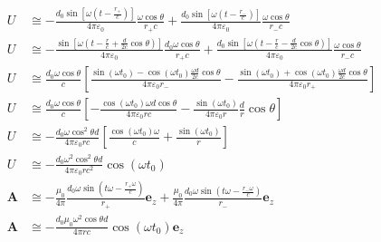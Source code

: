 \begin{align*}
    U&\cong-\frac{d_0\sin\left[\omega\left(t-\frac{r_{+}}{c}\right)\right]}{4\pi\varepsilon_0}\frac{
    \omega \cos\theta}{r_+c}
    +\frac{d_0\sin\left[\omega\left(t-\frac{r_-}{c}\right)\right]}{4\pi\varepsilon_0}\frac{\omega \cos\theta}{r_-c}\\
    U&\cong-\frac{\sin\left[\omega\left(t-\frac{r}{c}+\frac{d}{2c}\cos\theta\right)\right]}{4\pi\varepsilon_0}\frac{
    d_0\omega \cos\theta}{r_+c}
    +\frac{d_0\sin\left[\omega\left(t-\frac{r}{c}-\frac{d}{2c}\cos\theta\right)\right]}{4\pi\varepsilon_0}\frac{\omega \cos\theta}{r_-c}\\
    U&\cong\frac{d_0\omega\cos\theta}{c}\left[
    \frac{\sin\left(\omega t_0\right)
    -\cos\left(\omega t_0\right)\frac{\omega d}{2c}\cos\theta}{4\pi\varepsilon_0r_-}
    -\frac{\sin\left(\omega t_0\right)
    +\cos\left(\omega t_0\right)\frac{\omega d}{2c}\cos\theta}{4\pi\varepsilon_0r_+}\right]\\
    U&\cong\frac{d_0\omega\cos\theta}{c}\left[
    -\frac{
    \cos\left(\omega t_0\right)\omega d\cos\theta}{4\pi\varepsilon_0rc}-
    \frac{\sin\left(\omega t_0\right)
    }{4\pi\varepsilon_0r}\frac{d}{r}\cos\theta
    \right]\\
    U&\cong-\frac{d_0\omega\cos^2\theta d}{4\pi\varepsilon_0rc}\left[
    \frac{
    \cos\left(\omega t_0\right)\omega}{c}+
    \frac{\sin\left(\omega t_0\right)
    }{r}
    \right]\\
    U&\cong-\frac{d_0\omega^2\cos^2\theta d}{4\pi\varepsilon_0rc^2}
    \cos\left(\omega t_0\right)\\
    \boldsymbol{A}&\cong-\frac{\mu_0}{4\pi}\frac{d_0\omega\sin\left(t\omega-\frac{r_+\omega}{c}\right)}{r_+}\boldsymbol{e}_z
    +\frac{\mu_0}{4\pi}\frac{d_0\omega\sin\left(t\omega-\frac{r_-\omega}{c}\right)}{r_-}\boldsymbol{e}_z\\
    \boldsymbol{A}&\cong-\frac{d_0\mu_0\omega^2\cos\theta d}{4\pi rc}
    \cos\left(\omega t_0\right)\boldsymbol{e}_z
\end{align*}

